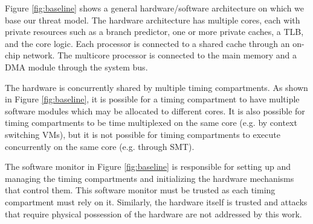     Figure \ref{fig:baseline} shows a general hardware/software architecture on 
    which we base our threat model. The hardware architecture has multiple 
    cores, each with private resources such as a branch predictor, one or more 
    private caches, a TLB, and the core logic. Each processor is connected to a 
    shared cache through an on-chip network. The multicore processor is 
    connected to the main memory and a DMA module through the system bus. 

    The hardware is concurrently shared by multiple timing compartments. As 
    shown in Figure \ref{fig:baseline}, it is possible for a timing compartment 
    to have multiple software modules which may be allocated to different 
    cores. It is also possible for timing compartments to be time multiplexed 
    on the same core (e.g.  by context switching VMs), but it is not possible 
    for timing compartments to execute concurrently on the same core (e.g.  
    through SMT).
    
    The software monitor in Figure \ref{fig:baseline} is responsible for 
    setting up and managing the timing compartments and initializing the 
    hardware mechanisms that control them. This software monitor must be 
    trusted as each timing compartment must rely on it. Similarly, the hardware 
    itself is trusted and attacks that require physical possession of the 
    hardware are not addressed by this work.
